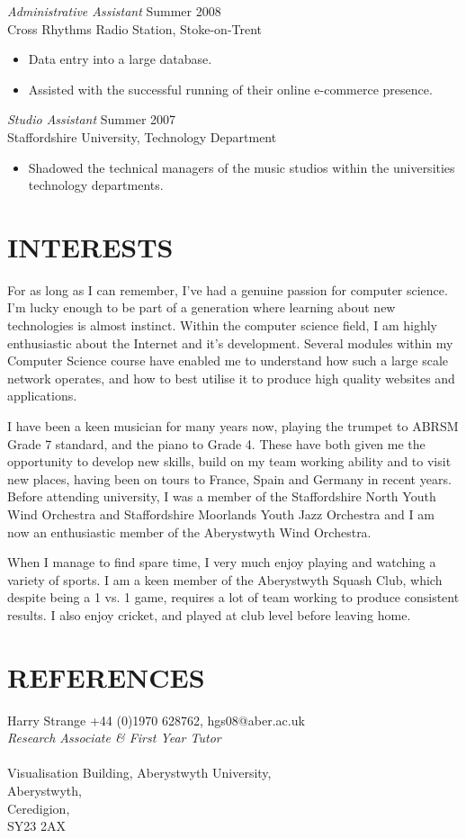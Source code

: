 \documentclass[line,margin]{res}
\begin{document}
\begin{resume}
                {\sl Administrative Assistant} \hfill            Summer 2008 \\
                Cross Rhythms Radio Station, Stoke-on-Trent
                 \begin{itemize}  \itemsep -2pt %
                 \item Data entry into a large database.
	        \item Assisted with the successful running of their online e-commerce presence.
                 \end{itemize} 

	{\sl Studio Assistant} \hfill Summer 2007 \\
	Staffordshire University, Technology Department
	\begin{itemize} \itemsep -2pt
	\item Shadowed the technical managers of the music studios within the universities technology departments.
	\end{itemize}
        

\section{INTERESTS}             
           For as long as I can remember, I've had a genuine passion for computer science. I'm lucky
enough to be part of a generation where learning about new technologies is almost
instinct. Within the computer science field, I am highly enthusiastic about the Internet
and it's development. Several modules within my Computer Science course have enabled me to
understand how such a large scale network operates, and how to best utilise it to produce
high quality websites and applications.

I have been a keen musician for many years now, playing the trumpet to ABRSM Grade 7
standard, and the piano to Grade 4. These have both given me the opportunity to develop new
skills, build on my team working ability and to visit new places, having been on tours to
France, Spain and Germany in recent years. Before attending university, I was a member of
the Staffordshire North Youth Wind Orchestra and Staffordshire Moorlands Youth Jazz
Orchestra and I am now an enthusiastic member of the Aberystwyth Wind Orchestra.

When I manage to find spare time, I very much enjoy playing and
watching a variety of sports. I am a keen member of the Aberystwyth Squash Club, which
despite being a 1 vs. 1 game, requires a lot of team working to produce consistent
results. I also enjoy cricket, and played at club level before leaving home.

\section{REFERENCES}Harry Strange \hfill +44 (0)1970 628762, hgs08@aber.ac.uk\\
{\sl Research Associate \& First Year Tutor}\\ \\
Visualisation Building, Aberystwyth University, \\Aberystwyth, \\Ceredigion, \\SY23 2AX

\end{resume}
\end{document}

